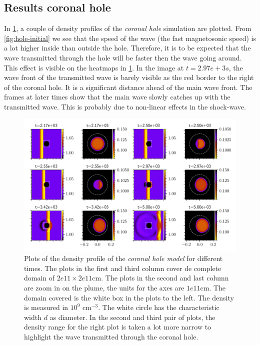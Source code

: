\subsection{Results coronal hole}

In \cref{fig:hole-frames}, a couple of density profiles of the \emph{coronal hole} simulation are plotted.
From \cref{fig:hole-initial} we see that the speed of the wave (the fast magnetosonic speed) is a lot higher inside than outside the hole.
Therefore, it is to be expected that the wave transmitted through the hole will be faster then the wave going around.
This effect is visible on the heatmaps in \cref{fig:hole-frames}. 
In the image at $t=2.97e+3s$, the wave front of the transmitted wave is barely visible as the red border to the right of the coronal hole. It is a significant distance ahead of the main wave front.
The frames at later times show that the main wave slowly catches up with the transmitted wave. This is probably due to non-linear effects in the shock-wave.

\begin{figure}[H]
	\centering
	\includegraphics[width=\linewidth]{images/hole-frames.pdf}
	\caption{Plots of the density profile of the \emph{coronal hole model} for different times. 
	The plots in the first and third column cover de complete domain of $2e11\times2e11$cm.
	The plots in the second and last column are zoom in on the plume, the units for the axes are $1e11$cm. 
	The domain covered is the white box in the plots to the left.
 The density is measured in $10^{9}$ cm$^{-3}$.
The white circle has the characteristic width $d$ as diameter. 
In the second and third pair of plots, the density range for the right plot is taken a lot more narrow to highlight the wave transmitted through the coronal hole. }
	\label{fig:hole-frames}
\end{figure}


